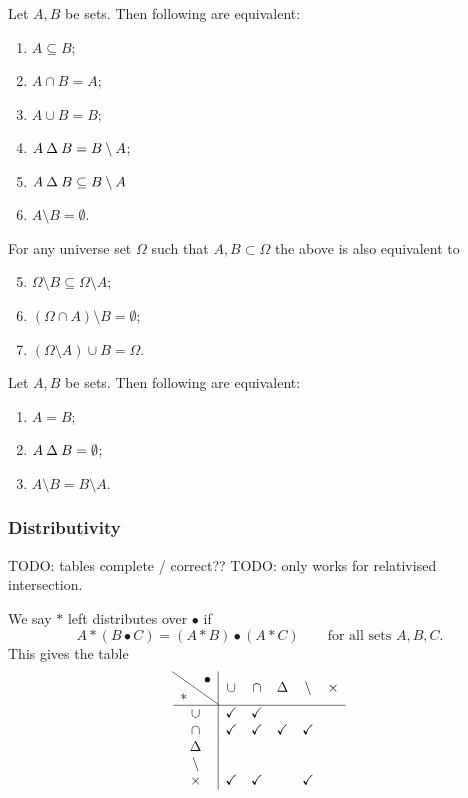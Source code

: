 \begin{lemma}
Let $A,B$ be sets. Then following are equivalent:
\begin{enumerate}
\item $A\subseteq B$;
\item $A\cap B = A$;
\item $A\cup B = B$;
\item $A\mathbin{\Delta} B = B\setminus A$;
\item $A\mathbin{\Delta} B \subseteq B\setminus A$
\item $A\setminus B = \emptyset$.
\end{enumerate}
For any universe set $\Omega$ such that $A,B\subset \Omega$ the above is also equivalent to
\begin{enumerate}\setcounter{enumi}{4}
\item $\Omega\setminus B \subseteq \Omega\setminus A$;
\item $(\Omega\cap A)\setminus B = \emptyset$;
\item $(\Omega\setminus A)\cup B = \Omega$.
\end{enumerate}
\end{lemma}
\begin{corollary}
Let $A,B$ be sets. Then following are equivalent:
\begin{enumerate}
\item $A=B$;
\item $A\mathbin{\Delta} B = \emptyset$;
\item $A\setminus B = B\setminus A$.
\end{enumerate}
\end{corollary}

\subsubsection{Distributivity}
TODO: tables complete / correct?? TODO: only works for relativised intersection.
\begin{lemma}
We say $*$ left distributes over $\bullet$ if
\[ A*(B\bullet C) = (A*B)\bullet (A*C) \qquad\text{for all sets $A,B,C$.} \]
This gives the table
\[ \begin{array}{c | c c c c c}
\text{\diagbox{$*$}{$\bullet$}} & \cup & \cap & \symdiff & \setminus & \times \\ \hline
\cup & \checkmark & \checkmark &  & & \\
\cap & \checkmark & \checkmark & \checkmark & \checkmark & \\
\symdiff &  &  &  & & \\
\setminus &  &  &  & & \\
\times & \checkmark & \checkmark &  & \checkmark &
\end{array} \]
\end{lemma}

